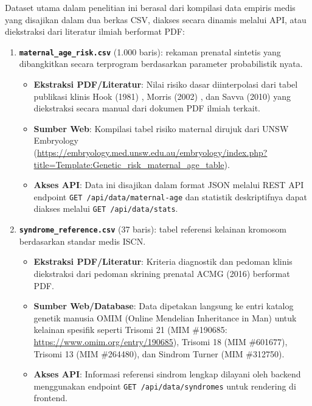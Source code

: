 \documentclass[10pt,a4paper,twocolumn]{article}
\begin{document}
Dataset utama dalam penelitian ini berasal dari kompilasi data empiris medis yang disajikan dalam dua berkas CSV, diakses secara dinamis melalui API, atau diekstraksi dari literatur ilmiah berformat PDF:

\begin{enumerate}[leftmargin=*,noitemsep,topsep=2pt]
    \item \textbf{\texttt{maternal\_age\_risk.csv}} (1.000 baris): rekaman prenatal sintetis yang dibangkitkan secara terprogram berdasarkan parameter probabilistik nyata.
        \begin{itemize}[noitemsep,topsep=1pt]
            \item \textbf{Ekstraksi PDF/Literatur}: Nilai risiko dasar diinterpolasi dari tabel publikasi klinis Hook (1981) \cite{hook1981}, Morris (2002) \cite{morris2002}, dan Savva (2010) \cite{savva2010} yang diekstraksi secara manual dari dokumen PDF ilmiah terkait.
            \item \textbf{Sumber Web}: Kompilasi tabel risiko maternal dirujuk dari UNSW Embryology (\url{https://embryology.med.unsw.edu.au/embryology/index.php?title=Template:Genetic_risk_maternal_age_table}).
            \item \textbf{Akses API}: Data ini disajikan dalam format JSON melalui REST API endpoint \texttt{GET /api/data/maternal-age} dan statistik deskriptifnya dapat diakses melalui \texttt{GET /api/data/stats}.
        \end{itemize}
    \item \textbf{\texttt{syndrome\_reference.csv}} (37 baris): tabel referensi kelainan kromosom berdasarkan standar medis ISCN.
        \begin{itemize}[noitemsep,topsep=1pt]
            \item \textbf{Ekstraksi PDF/Literatur}: Kriteria diagnostik dan pedoman klinis diekstraksi dari pedoman skrining prenatal ACMG (2016) \cite{acmg2016} berformat PDF.
            \item \textbf{Sumber Web/Database}: Data dipetakan langsung ke entri katalog genetik manusia OMIM (Online Mendelian Inheritance in Man) untuk kelainan spesifik seperti Trisomi 21 (MIM \#190685: \url{https://www.omim.org/entry/190685}), Trisomi 18 (MIM \#601677), Trisomi 13 (MIM \#264480), dan Sindrom Turner (MIM \#312750).
            \item \textbf{Akses API}: Informasi referensi sindrom lengkap dilayani oleh backend menggunakan endpoint \texttt{GET /api/data/syndromes} untuk rendering di frontend.
        \end{itemize}
\end{enumerate}
\end{document}
